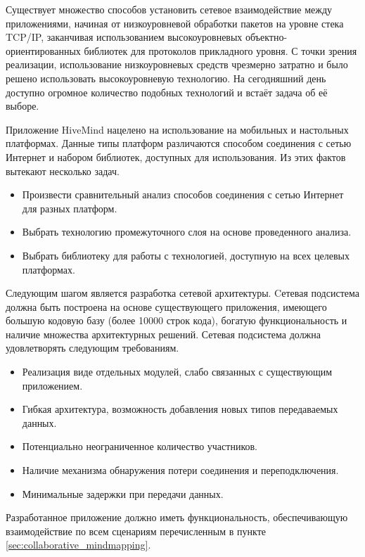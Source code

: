 Существует множество способов установить сетевое взаимодействие между
приложениями, начиная от низкоуровневой обработки пакетов на уровне стека
TCP/IP, заканчивая использованием высокоуровневых объектно-ориентированных
библиотек для протоколов прикладного уровня. С точки зрения реализации,
использование низкоуровневых средств чрезмерно затратно и было решено
использовать высокоуровневую технологию. На сегодняшний день доступно огромное
количество подобных технологий и встаёт задача об её выборе.

Приложение HiveMind нацелено на использование на мобильных и
настольных платформах. Данные типы платформ различаются способом соединения с
сетью Интернет и набором библиотек, доступных для использования. Из этих фактов
вытекают несколько задач.
\begin{itemize}
\item Произвести сравнительный анализ способов соединения с сетью Интернет для
разных платформ.
\item Выбрать технологию промежуточного слоя на основе проведенного анализа.
\item Выбрать библиотеку для работы с технологией, доступную на всех целевых
платформах.
\end{itemize}

Следующим шагом является разработка сетевой архитектуры. Cетевая подсистема
должна быть построена на основе существующего приложения, имеющего большую
кодовую базу (более 10000 строк кода), богатую функциональность и наличие
множества архитектурных решений. Сетевая подсистема должна удовлетворять
следующим требованиям.
\begin{itemize}
\item Реализация виде отдельных модулей, слабо связанных с существующим
приложением.
\item Гибкая архитектура, возможность добавления новых типов передаваемых
данных.
\item Потенциально неограниченное количество участников.
\item Наличие механизма обнаружения потери соединения и переподключения.
\item Минимальные задержки при передачи данных.
\end{itemize}
Разработанное приложение должно иметь функциональность, обеспечивающую
взаимодействие по всем сценариям перечисленным в пункте
\ref{sec:collaborative_mindmapping}.


